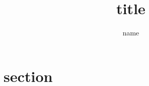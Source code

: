\documentclass{article}
\begin{document}
\title{title}
\author{name}
\maketitle

\section{section}
\ \\
\end{document}
